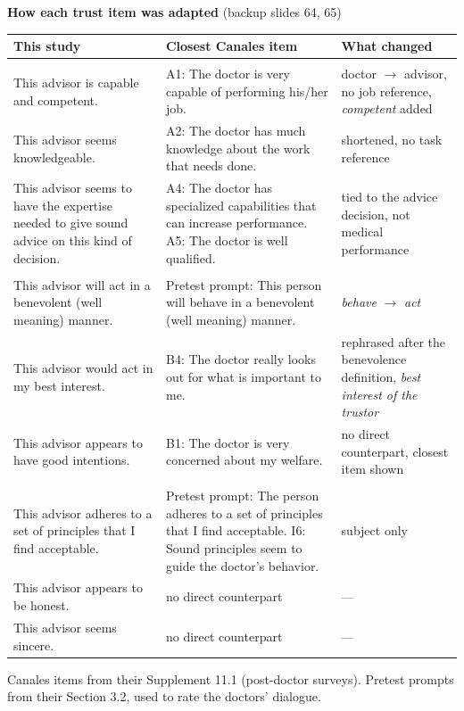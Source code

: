 \documentclass[11pt,a4paper]{article}
\begin{document}
\textbf{How each trust item was adapted} (backup slides 64, 65)\par
\vspace{0.2em}
{\small
\renewcommand{\arraystretch}{1.25}
\begin{tabular}{@{}>{\raggedright\arraybackslash}p{}>{\raggedright\arraybackslash}p{}>{\raggedright\arraybackslash}p{}@{}}
\toprule
\textbf{This study} & \textbf{Closest Canales item} & \textbf{What changed} \\
\midrule
\multicolumn{3}{@{}l}{\textbf{\color{knblue}Ability}} \\
This advisor is capable and competent. & A1: The doctor is very capable of performing his/her job. & doctor $\to$ advisor, no job reference, \emph{competent} added \\
This advisor seems knowledgeable. & A2: The doctor has much knowledge about the work that needs done. & shortened, no task reference \\
This advisor seems to have the expertise needed to give sound advice on this kind of decision. & A4: The doctor has specialized capabilities that can increase performance. A5: The doctor is well qualified. & tied to the advice decision, not medical performance \\
\midrule
\multicolumn{3}{@{}l}{\textbf{\color{knblue}Benevolence}} \\
This advisor will act in a benevolent (well meaning) manner. & Pretest prompt: This person will behave in a benevolent (well meaning) manner. & \emph{behave} $\to$ \emph{act} \\
This advisor would act in my best interest. & B4: The doctor really looks out for what is important to me. & rephrased after the benevolence definition, \emph{best interest of the trustor} \\
This advisor appears to have good intentions. & B1: The doctor is very concerned about my welfare. & \textcolor{knred}{no direct counterpart}, closest item shown \\
\midrule
\multicolumn{3}{@{}l}{\textbf{\color{knblue}Integrity}} \\
This advisor adheres to a set of principles that I find acceptable. & Pretest prompt: The person adheres to a set of principles that I find acceptable. I6: Sound principles seem to guide the doctor's behavior. & subject only \\
This advisor appears to be honest. & \textcolor{knred}{no direct counterpart} & --- \\
This advisor seems sincere. & \textcolor{knred}{no direct counterpart} & --- \\
\bottomrule
\end{tabular}\par}
\vspace{0.3em}
{\small\color{kngrey}Canales items from their Supplement 11.1 (post-doctor surveys). Pretest prompts from their Section 3.2, used to rate the doctors' dialogue.\par}
\end{document}
